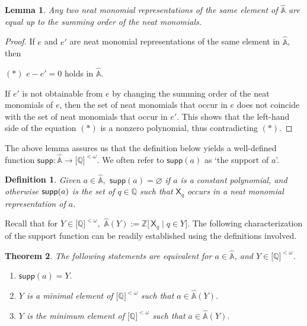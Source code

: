 \documentclass{amsart}
\newcommand{\qee} {\hspace*{2mm}\hfill \ding{109}}
\newtheorem{theorem}{Theorem}[section]
\newtheorem{define}[theorem]{Definition}
\newenvironment{definition}{\begin{define} \rm}{\qee\end{define}}
\newtheorem{lemma}{Lemma}[section]
\begin{document}
\begin{lemma} Any two neat monomial representations of the same element of 
$\hat{\mathbb{A}}$ are equal up to the summing order of the neat monomials.
\end{lemma}
\begin{proof} If $e$ and $e'$ are neat monomial representations of the same element in $\hat{\mathbb{A}}$, then 

$(*)$ $e-e'=0$ holds in $\hat{\mathbb{A}}.$

If  $e'$ is not obtainable from $e$ by changing the summing order
of the neat monomials of $e$, then the set of neat monomials that occur in $e$ does not
coincide with the set of neat monomials that occur in $e'$. This shows
that the left-hand side of the equation $(*)$ is a nonzero polynomial, thus
contradicting $(*)$.
\end{proof}

The above lemma assures us that the definition below yields a well-defined function  $%
\mathsf{supp}:\hat{\mathbb{A}}\rightarrow \lbrack \mathbb{Q}]^{<\omega }$. We often refer to $\mathsf{supp}%
(a)$ as `the support of $a$'.

\begin{definition} Given $a\in \hat{\mathbb{A}},$ $\mathsf{supp}%
(a)=\varnothing $ if $a$ is a constant polynomial, and otherwise $\mathsf{%
supp}(a)$ is the set of $q\in \mathbb{Q}$ such that $\mathsf{X}_{q}$ occurs
in a neat monomial representation of $a$.
\end{definition}
Recall that for $Y\in \lbrack \mathbb{Q}]^{<\omega },$ $\hat{\mathbb{A}}(Y):=%
\mathbb{Z}[\,\mathsf{X}_{q}\mathop\mid q\in Y\mathbb{]}.$ The following characterization
of the support function can be readily established using the definitions
involved.

\begin{theorem} The following statements are equivalent for $a\in \hat{\mathbb{A}}$, and $Y\in \lbrack \mathbb{Q}%
]^{<\omega }$.
\begin{enumerate}[$1$.]
    \item  $\mathsf{supp}(a)=Y.$

 \item $Y$ is a minimal element of $\lbrack \mathbb{Q}]^{<\omega}$ such that $a\in \hat{\mathbb{A}}(Y)$.

 \item $Y$ is the minimum element of $\lbrack \mathbb{Q}]^{<\omega}$ such that $a\in \hat{\mathbb{A}}(Y)$.
\end{enumerate}
\end{theorem}
\end{document}
